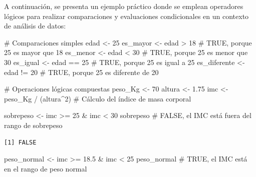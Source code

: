 \documentclass[
  spanish,
  a4paper,
  DIV=11,
  numbers=noendperiod,
  onepage,
  openany]{scrreprt}
\newenvironment{Shaded}{\begin{snugshade}}{\end{snugshade}}
\newcommand{\CommentTok}[1]{\textcolor[rgb]{0.37,0.37,0.37}{#1}}
\newcommand{\DecValTok}[1]{\textcolor[rgb]{0.68,0.00,0.00}{#1}}
\newcommand{\FloatTok}[1]{\textcolor[rgb]{0.68,0.00,0.00}{#1}}
\newcommand{\NormalTok}[1]{\textcolor[rgb]{0.00,0.23,0.31}{#1}}
\newcommand{\OtherTok}[1]{\textcolor[rgb]{0.00,0.23,0.31}{#1}}
\newcommand{\SpecialCharTok}[1]{\textcolor[rgb]{0.37,0.37,0.37}{#1}}
\begin{document}
A continuación, se presenta un ejemplo práctico donde se emplean
operadores lógicos para realizar comparaciones y evaluaciones
condicionales en un contexto de análisis de datos:

\begin{Shaded}
\begin{Highlighting}[]
\CommentTok{\# Comparaciones simples}
\NormalTok{edad }\OtherTok{\textless{}{-}} \DecValTok{25}
\NormalTok{es\_mayor }\OtherTok{\textless{}{-}}\NormalTok{ edad }\SpecialCharTok{\textgreater{}} \DecValTok{18}          \CommentTok{\# TRUE, porque 25 es mayor que 18}
\NormalTok{es\_menor }\OtherTok{\textless{}{-}}\NormalTok{ edad }\SpecialCharTok{\textless{}} \DecValTok{30}          \CommentTok{\# TRUE, porque 25 es menor que 30}
\NormalTok{es\_igual }\OtherTok{\textless{}{-}}\NormalTok{ edad }\SpecialCharTok{==} \DecValTok{25}         \CommentTok{\# TRUE, porque 25 es igual a 25}
\NormalTok{es\_diferente }\OtherTok{\textless{}{-}}\NormalTok{ edad }\SpecialCharTok{!=} \DecValTok{20}     \CommentTok{\# TRUE, porque 25 es diferente de 20}

\CommentTok{\# Operaciones lógicas compuestas}
\NormalTok{peso\_Kg }\OtherTok{\textless{}{-}} \DecValTok{70}
\NormalTok{altura }\OtherTok{\textless{}{-}} \FloatTok{1.75}
\NormalTok{imc }\OtherTok{\textless{}{-}}\NormalTok{ peso\_Kg }\SpecialCharTok{/}\NormalTok{ (altura}\SpecialCharTok{\^{}}\DecValTok{2}\NormalTok{)    }\CommentTok{\# Cálculo del índice de masa corporal}

\NormalTok{sobrepeso }\OtherTok{\textless{}{-}}\NormalTok{ imc }\SpecialCharTok{\textgreater{}=} \DecValTok{25} \SpecialCharTok{\&}\NormalTok{ imc }\SpecialCharTok{\textless{}} \DecValTok{30}      
\NormalTok{sobrepeso   }\CommentTok{\# FALSE, el IMC está fuera del rango de sobrepeso}
\end{Highlighting}
\end{Shaded}

\begin{verbatim}
[1] FALSE
\end{verbatim}

\begin{Shaded}
\begin{Highlighting}[]
\NormalTok{peso\_normal }\OtherTok{\textless{}{-}}\NormalTok{ imc }\SpecialCharTok{\textgreater{}=} \FloatTok{18.5} \SpecialCharTok{\&}\NormalTok{ imc }\SpecialCharTok{\textless{}} \DecValTok{25}  
\NormalTok{peso\_normal }\CommentTok{\# TRUE, el IMC está en el rango de peso normal}
\end{Highlighting}
\end{Shaded}
\end{document}
